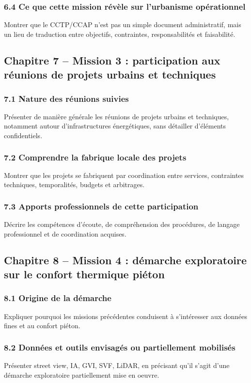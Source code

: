 \documentclass[11pt,a4paper]{article}
\begin{document}
\subsubsection{6.4 Ce que cette mission révèle sur l'urbanisme opérationnel}
Montrer que le CCTP/CCAP n'est pas un simple document administratif, mais un lieu de traduction entre objectifs, contraintes, responsabilités et faisabilité.

\subsection{Chapitre 7 -- Mission 3 : participation aux réunions de projets urbains et techniques}

\subsubsection{7.1 Nature des réunions suivies}
Présenter de manière générale les réunions de projets urbains et techniques, notamment autour d'infrastructures énergétiques, sans détailler d'éléments confidentiels.

\subsubsection{7.2 Comprendre la fabrique locale des projets}
Montrer que les projets se fabriquent par coordination entre services, contraintes techniques, temporalités, budgets et arbitrages.

\subsubsection{7.3 Apports professionnels de cette participation}
Décrire les compétences d'écoute, de compréhension des procédures, de langage professionnel et de coordination acquises.

\subsection{Chapitre 8 -- Mission 4 : démarche exploratoire sur le confort thermique piéton}

\subsubsection{8.1 Origine de la démarche}
Expliquer pourquoi les missions précédentes conduisent à s'intéresser aux données fines et au confort piéton.

\subsubsection{8.2 Données et outils envisagés ou partiellement mobilisés}
Présenter street view, IA, GVI, SVF, LiDAR, en précisant qu'il s'agit d'une démarche exploratoire partiellement mise en oeuvre.
\end{document}
